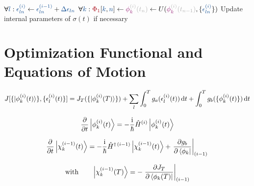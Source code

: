 \documentclass[aps,pra,twocolumn,notitlepage,letterpaper]{revtex4}
\newcommand{\Op}[1]{\hat{#1}}
\newcommand{\dd}[0]{\,\text{d}}
\newcommand{\VarScalar}[1]{{\color{clVarScalar}#1}}
\newcommand{\VarState}[1]{\ensuremath{\textcolor{clVarState}{#1}}}
\newcommand{\PropAnnotation}[1]{\textcolor{black!30}{#1}}
\newcommand{\VarPropState}[4]{\ensuremath{\VarState{#1}_{\textcolor{clVarState}{#2}}^{\PropAnnotation{#3}}\PropAnnotation{(#4)}}}  %
\newcommand{\VarArray}[1]{{\color{clVarArray}#1}}
\newcommand{\Forall}{\boldsymbol{\forall}}
\begin{document}
\begin{algorithm}
\begin{algorithmic}[1]
         \EndIf
         \State $\Forall \VarScalar{l}: \VarScalar{\epsilon_{ln}^{(i)}} \gets \VarScalar{\epsilon_{ln}^{(i-1)}} + \VarScalar{\Delta \epsilon_{ln}}$ 
         \State $\Forall \VarScalar{k}: \VarArray{\Phi_1}[\VarScalar{k},\VarScalar{n}] \gets \VarPropState{\phi}{k}{(i)}{t_n} \gets U(\VarPropState{\phi}{k}{(i)}{t_{n-1}}, \{\VarScalar{\epsilon_{ln}^{(i)}}\})$  \label{ln:prop3}
      \EndFor
        \State Update internal parameters of $\sigma(t)$ \label{ln:sigma_update} if necessary
      \EndIf
    \EndProcedure
  \end{algorithmic}
\end{algorithm}


\section*{Optimization Functional and Equations of Motion}

\begin{equation}
  \label{eq:functional}
  J[\{\ket{\phi_k^{(i)}(t)}\}, \{\epsilon_l^{(i)}(t)\}]
    = J_T(\{\ket{\phi_k^{(i)}(T)}\})
        + \sum_l \int_0^T g_a(\epsilon_l^{(i)}(t)) \dd t
        + \int_0^T g_b(\{\phi^{(i)}_k(t)\}) \dd t
\end{equation}

\begin{equation}%
  \label{eq:fw_eqm}
  \frac{\partial}{\partial t} \Ket{\phi_k^{(i)}(t)} =
  -\frac{\mathrm{i}}{\hbar} \Op{H}^{(i)} \Ket{\phi_k^{(i)}(t)}
\end{equation}

\begin{equation}%
  \label{eq:bw_eqm}
  \frac{\partial}{\partial t} \Ket{\chi_k^{(i-1)}(t)}
  = -\frac{\mathrm{i}}{\hbar} \Op{H}^{\dagger\,(i-1)} \Ket{\chi_k^{(i-1)}(t)}
    + \left.\frac{\partial g_b}{\partial \Bra{\phi_k}}\right\vert_{(i-1)}\,
\end{equation}

\begin{equation}%
  \label{eq:chi_boundary}
  \text{with}\qquad
  \Ket{\chi_k^{(i-1)}(T)}
  = - \left.\frac{\partial J_T}{\partial \Bra{\phi_k(T)}}
    \right\vert_{(i-1)}
\end{equation}
\end{document}
